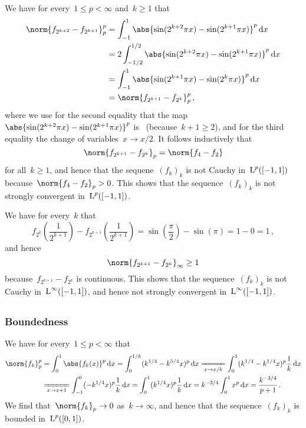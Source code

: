 We have for every~$1 \leq p < \infty$ and~$k \geq 1$ that
\begin{align*}
  \norm{f_{2^{k+2}} - f_{2^{k+1}}}_p^p
  &=
  \int_{-1}^1 \abs{ \sin(2^{k+2} \pi x) - \sin(2^{k+1} \pi x) }^p \dd{x}  \\
  &=
  2 \int_{-1/2}^{1/2} \abs{ \sin(2^{k+2} \pi x) - \sin(2^{k+1} \pi x) }^p \dd{x}  \\
  &=
  \int_{-1}^1 \abs{ \sin(2^{k+1} \pi x) - \sin(2^k \pi x) }^p \dd{x}  \\
  &=
  \norm{f_{2^{k+1}} - f_{2^k}}_p^p \,,
\end{align*}
where we use for the second equality that the map~$\abs{\sin(2^{k+2} \pi x) - \sin(2^{k+1} \pi x)}^p$ is~ (because~$k+1 \geq 2$), and for the third equality the change of variables~$x \to x/2$.
It follows inductively that
\[
    \norm{f_{2^{k+1}} - f_{2^k}}_p
  = \norm{f_4 - f_2}
\]
for all~$k \geq 1$, and hence that the sequene~$(f_k)_k$ is not Cauchy in~$\operatorname{L}^p([-1,1])$ because~$\norm{f_4 - f_2}_p > 0$.
This shows that the sequence~$(f_k)_k$ is not strongly convergent in~$\operatorname{L}^p([-1,1])$.

We have for every~$k$ that
\[
      f_{2^k}\left( \frac{1}{2^{k+1}} \right)
    - f_{2^{k+1}}\left( \frac{1}{2^{k+1}} \right)
  =   \sin\left( \frac{\pi}{2} \right)
    - \sin(\pi)
  = 1 - 0
  = 1 \,,
\]
and hence
\[
        \norm{ f_{2^{k+1}} - f_{2^k} }_\infty
  \geq  1
\]
because~$f_{2^{k+1}} - f_{2^k}$ is continuous.
This shows that the sequence~$(f_k)_k$ is not Cauchy in~$\operatorname{L}^\infty([-1,1])$, and hence not strongly convergent in~$\operatorname{L}^\infty([-1,1])$.





\subsection{}


\subsubsection{Boundedness}

We have for every~$1 \leq p < \infty$ that
\begin{align*}
  \norm{f_k}_p^p
  &=
  \int_0^1 \abs{f_k(x)}^p \dd{x}
  =
  \int_0^{1/k} ( k^{1/4} - k^{5/4} x )^p \dd{x}
  \xlongequal[x \to x/k]{}
  \int_0^1 ( k^{1/4} - k^{1/4} x )^p \frac{1}{k} \dd{x} \\
  &\xlongequal[x \to x+1]{}
  \int_{-1}^0 (-k^{1/4} x)^p \frac{1}{k} \dd{x}
  =
  \int_0^1 (k^{1/4} x)^p \frac{1}{k} \dd{x}
  =
  k^{-3/4} \int_0^1 x^p \dd{x}
  =
  \frac{k^{-3/4}}{p+1} \,.
\end{align*}
We find that~$\norm{f_k}_p \to 0$ as~$k \to \infty$, and hence that the sequence~$(f_k)_k$ is bounded in~$\operatorname{L}^p([0,1])$.

